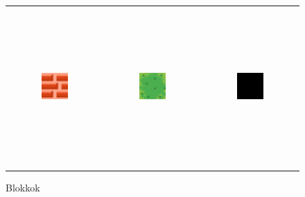 \begin{figure}[h!]
    \begin{center}
        \begin{tabular}{ ccc}
            \includegraphics[width=0.3\textwidth, height=60mm]{images/block_brick.png}
            & 
            \includegraphics[width=0.3\textwidth, height=60mm]{images/block_grass.png}    
            & 
            \includegraphics[width=0.3\textwidth, height=60mm]{images/block_empty.png}
            \\
        \end{tabular}
        \caption{Blokkok}
        \label{tbl:Blocks}
    \end{center}
\end{figure}

\medskip

